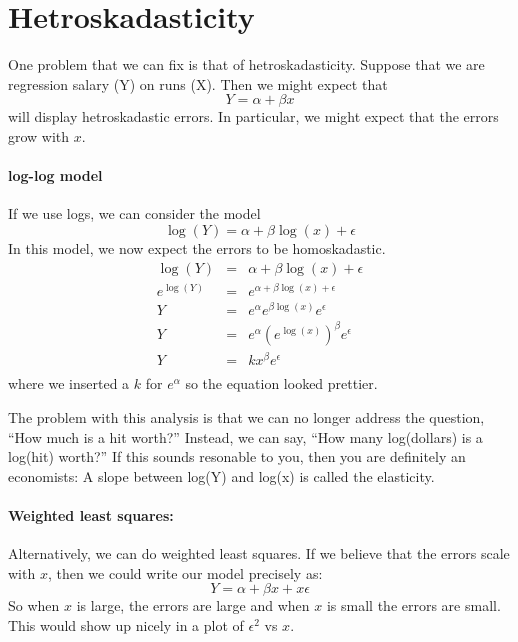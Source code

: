 \documentclass{article} %
\begin{document}
\section{Hetroskadasticity}

One problem that we can fix is that of hetroskadasticity.  Suppose
that we are regression salary (Y) on runs (X).  Then we might expect
that 
\begin{displaymath}
Y = \alpha + \beta x
\end{displaymath}
will display hetroskadastic errors.  In particular, we might expect
that the errors grow with $x$.  

\paragraph{log-log model}  If we use logs, we can consider the model
\begin{displaymath}
\log(Y) = \alpha + \beta \log(x) + \epsilon
\end{displaymath}
In this model, we now expect the errors to be homoskadastic.  
\begin{eqnarray*}
\log(Y) & = & \alpha + \beta \log(x) + \epsilon\\
e^{\log(Y)} & = & e^{\alpha + \beta \log(x) + \epsilon}\\
Y & = & e^{\alpha} e^{\beta \log(x)} e^{\epsilon}\\
Y & = & e^{\alpha} (e^{\log(x)})^\beta  e^{\epsilon}\\
Y & = & k x^\beta  e^{\epsilon}\\
\end{eqnarray*}
where we inserted a $k$ for $e^{\alpha}$ so the equation looked
prettier. 

The problem with this analysis is that we can no longer address the
question, ``How much is a hit worth?''  Instead, we can say, ``How
many log(dollars) is a log(hit) worth?''  If this sounds resonable to
you, then you are definitely an economists:  A slope between
log(Y) and log(x) is called the elasticity.

\paragraph{Weighted least squares:} Alternatively, we can do weighted
least squares.  If we believe that the errors scale with $x$, then we
could write our model precisely as:
\begin{displaymath}
Y = \alpha + \beta x + x \epsilon
\end{displaymath}
So when $x$ is large, the errors are large and when $x$ is small the
errors are small.  This would show up nicely in a plot of $\epsilon^2$
vs $x$.  
\end{document}
